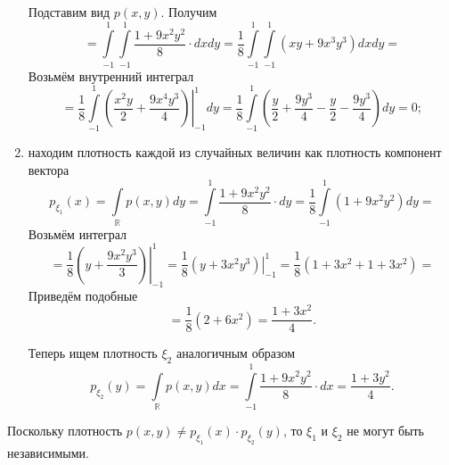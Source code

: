 \begin{enumerate}[label=\alph*)]
\begin{equation*}
  \end{equation*}
  Подставим вид $p \left( x, y \right) $.
  Получим
  \begin{equation*}
    = \int \limits_{-1}^1
      \int \limits_{-1}^1 \frac{1 + 9x^2 y^2}{8} \cdot dx
    dy =
    \frac{1}{8}
    \int \limits_{-1}^1 \int \limits_{-1}^1 \left( xy + 9x^3 y^3 \right) dxdy =
  \end{equation*}
  Возьмём внутренний интеграл
  \begin{equation*}
    = \frac{1}{8} \int \limits_{-1}^1
      \left. \left( \frac{x^2 y}{2} + \frac{9x^4 y^3}{4} \right) \right|_{-1}^1
    dy =
    \frac{1}{8} \int \limits_{-1}^1
      \left( \frac{y}{2} + \frac{9y^3}{4} - \frac{y}{2} - \frac{9y^3}{4} \right)
    dy =
    0;
  \end{equation*}
  \item находим плотность
  каждой из случайных величин как плотность компонент вектора
  \begin{equation*}
    p_{ \xi_1} \left( x \right) =
    \int \limits_{ \mathbb{R}} p \left( x, y \right) dy =
    \int \limits_{-1}^1 \frac{1 + 9x^2 y^2}{8} \cdot dy =
    \frac{1}{8} \int \limits_{-1}^1 \left( 1 + 9x^2 y^2 \right) dy =
  \end{equation*}
  Возьмём интеграл
  \begin{equation*}
    = \frac{1}{8} \left. \left( y + \frac{9x^2 y^3}{3} \right) \right|_{-1}^1 =
    \frac{1}{8} \left. \left( y + 3x^2 y^3 \right) \right|_{-1}^1 =
    \frac{1}{8} \left( 1 + 3x^2 + 1 + 3x^2 \right) =
  \end{equation*}
  Приведём подобные
  \begin{equation*}
    = \frac{1}{8} \left( 2 + 6x^2 \right) =
    \frac{1 + 3x^2}{4}.
  \end{equation*}

  Теперь ищем плотность $ \xi_2$ аналогичным образом
  \begin{equation*}
    p_{ \xi_2} \left( y \right) =
    \int \limits_{ \mathbb{R}} p \left( x, y \right) dx =
    \int \limits_{-1}^1 \frac{1 + 9x^2 y^2}{8} \cdot dx =
    \frac{1 + 3y^2}{4}.
  \end{equation*}
\end{enumerate}

Поскольку плотность
$p \left( x, y \right) \neq
 p_{ \xi_1} \left( x \right) \cdot p_{ \xi_2} \left( y \right) $,
то $ \xi_1$ и $ \xi_2$ не могут быть независимыми.
